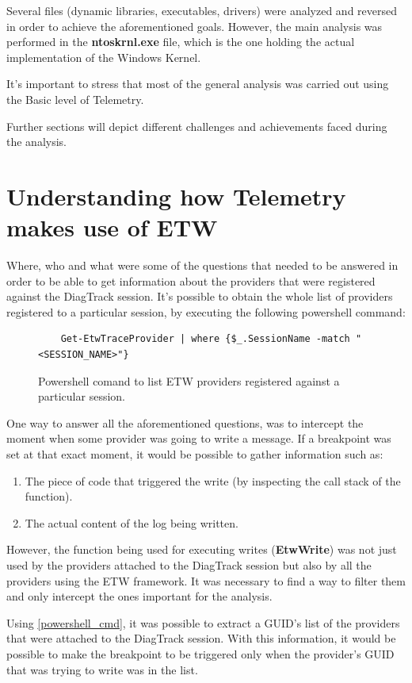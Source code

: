 Several files (dynamic libraries, executables, drivers) were analyzed and reversed in order to achieve the aforementioned goals. However, the main analysis was performed in the {\bfseries ntoskrnl.exe} file, which is the one holding the actual implementation of the Windows Kernel.

It's important to stress that most of the general analysis was carried out using the Basic level of Telemetry. 

Further sections will depict different challenges and achievements faced during the analysis.

\section{Understanding how Telemetry makes use of ETW}
Where, who and what were some of the questions that needed to be answered in order to be able to get information about the providers that were registered against the DiagTrack session. 
It's possible to obtain the whole list of providers registered to a particular session, by executing the following powershell command: 

\begin{figure}[H]
  \begin{lstlisting}
    Get-EtwTraceProvider | where {$_.SessionName -match "<SESSION_NAME>"}
  \end{lstlisting} 
  \caption[]{Powershell comand to list ETW providers registered against a particular session. }
  \label{fig:powershell_cmd}
\end{figure}

One way to answer all the aforementioned questions, was to intercept the moment when some provider was going to write a message. If a breakpoint was set at that exact moment, it would be possible to gather information such as: 
\begin{enumerate}
\item The piece of code that triggered the write (by inspecting the call stack of the function).
\item The actual content of the log being written.
\end{enumerate} 
However, the function being used for executing writes ({\bfseries EtwWrite}) was not just used by the providers attached to the DiagTrack session but also by all the providers using the ETW framework. It was necessary to find a way to filter them and only intercept the ones important for the analysis. 

Using \ref{powershell_cmd}, it was possible to extract a GUID's list of the providers that were attached to the DiagTrack session. With this information, it would be possible to make the breakpoint to be triggered only when the provider's GUID that was trying to write was in the list. 

